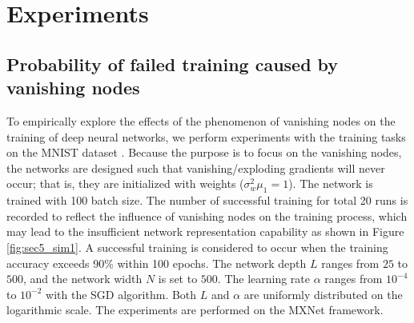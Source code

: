 \chapter{Experiments} \label{experiments}






\section {Probability of failed training caused by vanishing nodes}

To empirically explore the effects of the phenomenon of vanishing nodes on the training of deep neural
networks, we perform experiments with the training tasks on the MNIST dataset \cite{mnist}.
Because the purpose is to focus on the  vanishing nodes, the networks are designed such that
vanishing/exploding gradients will never occur; that is, they are initialized with weights
($\sigma_w^2\mu_1=1$).
The network is trained with 100 batch size.
The number of successful training for total 20 runs is recorded to reflect the influence of vanishing
nodes on the training process, which may lead to the insufficient network representation capability
as shown in Figure \ref{fig:sec5_sim1}.
A successful training is considered to occur when the training accuracy exceeds 90\% within 100 epochs. 
The network depth $L$ ranges from $25$ to $500$, and the network width $N$ is set to $500$.
The learning rate $\alpha$ ranges from $10^{-4}$ to $10^{-2}$ with the SGD algorithm.
Both $L$ and $\alpha$ are uniformly distributed on the logarithmic scale.
The experiments are performed on the MXNet framework\cite{mxnet}.

